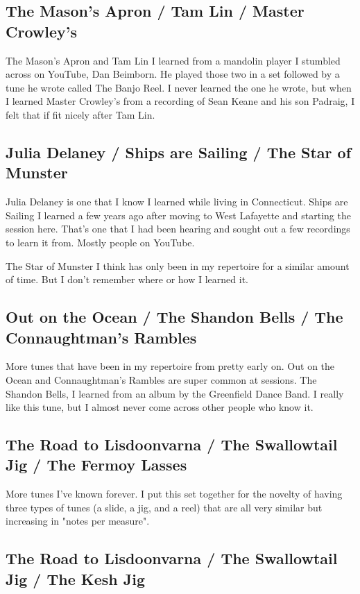\documentclass[11pt,letterpaper]{article}
\begin{document}
\subsection*{The Mason's Apron / Tam Lin / Master Crowley's}

The Mason's Apron and Tam Lin I learned from a mandolin player I stumbled across on YouTube, Dan Beimborn. He played those two in a set followed by a tune he wrote called The Banjo Reel. I never learned the one he wrote, but when I learned Master Crowley's from a recording of Sean Keane and his son Padraig, I felt that if fit nicely after Tam Lin.

\subsection*{Julia Delaney / Ships are Sailing / The Star of Munster}
Julia Delaney is one that I know I learned while living in Connecticut. Ships are Sailing I learned a few years ago after moving to West Lafayette and starting the session here. That's one that I had been hearing and sought out a few recordings to learn it from. Mostly people on YouTube.

The Star of Munster I think has only been in my repertoire for a similar amount of time. But I don't remember where or how I learned it. 

\subsection*{Out on the Ocean / The Shandon Bells / The Connaughtman's Rambles}

More tunes that have been in my repertoire from pretty early on. Out on the Ocean and Connaughtman's Rambles are super common at sessions. The Shandon Bells, I learned from an album by the Greenfield Dance Band. I really like this tune, but I almost never come across other people who know it. 

\subsection*{The Road to Lisdoonvarna / The Swallowtail Jig / The Fermoy Lasses}

More tunes I've known forever. I put this set together for the novelty of having three types of tunes (a slide, a jig, and a reel) that are all very similar but increasing in "notes per measure".

\subsection*{The Road to Lisdoonvarna / The Swallowtail Jig / The Kesh Jig}
\end{document}
